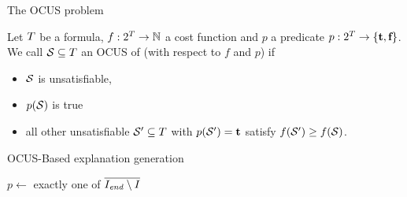 \documentclass[12pt,aspectratio=169]{beamer}
\begin{document}
% 

% 
% 
 \begin{frame}{The OCUS problem}
 \begin{definition}
   Let $T$ be a formula, $f:2^{T} \to \mathbb{N}$ a cost function and  $p$ a predicate $p: 2^{T}\to \{\textbf{t},\textbf{f}\}$. We call %
    $\mathcal{S} \subseteq T$ an OCUS of \formula (with respect to $f$ and $p$) if \begin{itemize}                                      
      \item $\mathcal{S}$ is unsatisfiable,
      \item $p(\mathcal{S})$ is true
      \item all other unsatisfiable $\mathcal{S}'\subseteq T$ with $p(\mathcal{S}')=\textbf{t}$ satisfy $f(\mathcal{S}')\geq f(\mathcal{S})$.
    \end{itemize}
\end{definition}
\end{frame}


\newcommand\onestepo{\ensuremath{\call{explain-One-Step-ocus}}\xspace}
\begin{frame}{OCUS-Based explanation generation}
 \begin{algorithm}[H]
  \DontPrintSemicolon
  \caption{$\onestepo(T,f,I,\Iend)$}
  \label{alg:oneStepOCUS}
  $p \leftarrow$ exactly one of $\overline{I_{\mathit{end}}\setminus I}$\;
\end{algorithm}
\end{frame}
\end{document}
